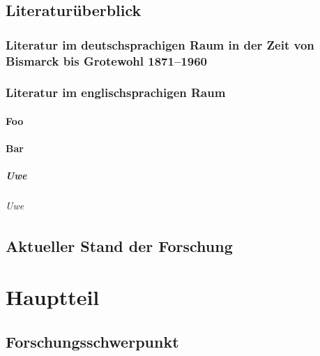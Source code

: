\documentclass[ngerman,12pt,parskip=half]{scrreprt}
\begin{document}
\section{Literaturüberblick}

\blindtext[15]

\subsection[Literatur im deutschsprachigen Raum]{Literatur im deutschsprachigen Raum in der Zeit von Bismarck bis Grotewohl 1871--1960}

\blindtext[5]

\subsection{Literatur im englischsprachigen Raum}

\blindtext[5]

\subsubsection{Foo}

\blindtext[5]

\subsubsection{Bar}

\blindtext[5]

\paragraph{Uwe} \blindtext

\subparagraph{Uwe} \blindtext

\section{Aktueller Stand der Forschung}

\blindtext[5]



\chapter{Hauptteil}

\section{Forschungsschwerpunkt}
\end{document}
